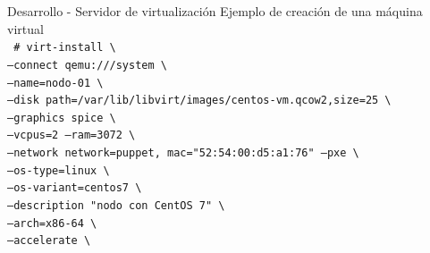 \begin{frame}{Desarrollo - Servidor de virtualización}
    \vspace{-1cm} {Ejemplo de creación de una máquina virtual}
    \\
    \vspace{0.5cm}
    \begingroup
    \fontsize{8pt}{12pt}\selectfont
        \texttt{
        \# virt-install \textbackslash \\
           \hspace{0.75cm} --connect qemu:///system \textbackslash \\
           \hspace{0.75cm} --name=nodo-01 \textbackslash \\
           \hspace{0.75cm} --disk path=/var/lib/libvirt/images/centos-vm.qcow2,size=25 \textbackslash \\
           \hspace{0.75cm} --graphics spice \textbackslash \\
           \hspace{0.75cm} --vcpus=2 --ram=3072 \textbackslash \\
           \hspace{0.75cm} --network network=puppet, mac="52:54:00:d5:a1:76" --pxe \textbackslash \\
           \hspace{0.75cm} --os-type=linux \textbackslash \\
           \hspace{0.75cm} --os-variant=centos7 \textbackslash \\
           \hspace{0.75cm} --description "nodo con CentOS 7" \textbackslash  \\
           \hspace{0.75cm} --arch=x86-64 \textbackslash \\
           \hspace{0.75cm} --accelerate \textbackslash \\
        }    
    \endgroup    
\end{frame}

